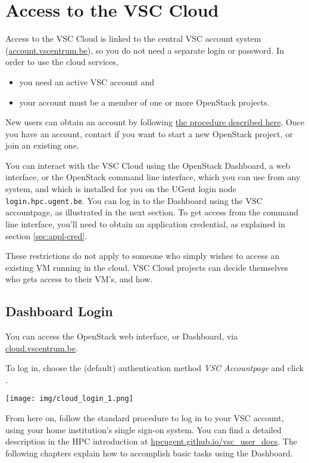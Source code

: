 \chapter{Access to the VSC Cloud}
Access to the VSC Cloud is linked to the central VSC account system
(\href{https://account.vscentrum.be}{account.vscentrum.be}), so you do
not need a separate login or password.  In order to use the cloud
services,
\begin{itemize}
\item you need an active VSC account and
\item your account must be a member of one or more OpenStack projects.
\end{itemize}
New users can obtain an account by following
\href{https://vlaams-supercomputing-centrum-vscdocumentation.readthedocs-hosted.com/en/latest/access/account_request.html}{the
  procedure described here}.  Once you have an account, contact
\cloudinfo if you want to start a new OpenStack project, or join an
existing one.

You can interact with the VSC Cloud using the OpenStack Dashboard, a
web interface, or the OpenStack command line interface, which you can
use from any system, and which is installed for you on the UGent login
node \lstinline{login.hpc.ugent.be}.  You can log in to the Dashboard
using the VSC accountpage, as illustrated in the next section.  To get
access from the command line interface, you'll need to obtain an
application credential, as explained in section \ref{sec:appl-cred}.

These restrictions do not apply to someone who simply wishes to access
an existing VM running in the cloud.  VSC Cloud projects can decide
themselves who gets access to their VM's, and how.

\section{Dashboard Login}\label{sec:dashboard-login}
You can access the OpenStack web interface, or Dashboard, via \href{https://cloud.vscentrum.be}{cloud.vscentrum.be}.

To log in, choose the (default) authentication method \emph{VSC Accountpage} and click .
\begin{center}
\texttt{[image: img/cloud\_login\_1.png]}
\end{center}

From here on, follow the standard procedure to log in to your VSC
account, using your home institution's single sign-on system.  You can
find a detailed description in the HPC introduction at
\href{https://hpcugent.github.io/vsc\_user\_docs}{hpcugent.github.io/vsc\_user\_docs}.
The following chapters explain how to accomplish basic tasks using the Dashboard.

